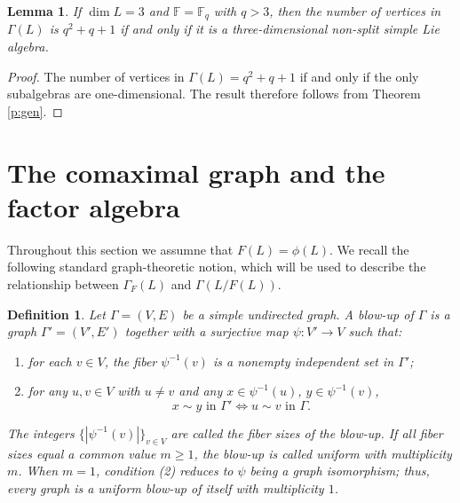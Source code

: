 \documentclass[11pt]{amsart}
\theoremstyle{plain}
\newtheorem{lemma}[theorem]{Lemma}
\newtheorem{definition}{Definition}[section]
\def\F{\mathbb{F}}
\begin{document}
\begin{lemma}
If $\dim L=3$ and $\F=\F_q$ with $q>3$, then the number of vertices in $\Gamma(L)$ is $q^2+q+1$ if and only if it is a three-dimensional non-split simple Lie algebra.
\end{lemma}
\begin{proof}
The number of vertices in $\Gamma(L)=q^2+q+1$ if and only if the only subalgebras are one-dimensional. The result therefore follows from Theorem \ref{p:gen}.   
\end{proof}





\section{The comaximal graph and the factor algebra }





Throughout this section we assumne that $F(L)=\phi(L)$. We recall the following standard graph-theoretic notion, which will be used to describe the relationship between $\Gamma_F(L)$ and $\Gamma(L/F(L))$.

\begin{definition}\label{blowup0}
Let $\Gamma = (V, E)$ be a simple undirected graph. A \emph{blow-up} of
$\Gamma$ is a graph $\Gamma' = (V', E')$ together with a surjective map
$\psi : V' \to V$ such that:
\begin{enumerate}
\item[(a)] for each $v \in V$, the fiber $\psi^{-1}(v)$ is a nonempty independent
      set in $\Gamma'$;
\item[(b)] for any $u, v \in V$ with $u \neq v$ and any $x \in \psi^{-1}(u)$,
      $y \in \psi^{-1}(v)$,
      \[x \sim y \text{ in } \Gamma'   \iff  u \sim v \text{ in } \Gamma.\]
\end{enumerate}
The integers $\{|\psi^{-1}(v)|\}_{v \in V}$ are called the \emph{fiber sizes}
of the blow-up. If all fiber sizes equal a common value $m \geq 1$, the
blow-up is called \emph{uniform} with \emph{multiplicity} $m$. When $m = 1$,
condition (2) reduces to $\psi$ being a graph isomorphism; thus, every graph is a uniform blow-up of itself with multiplicity $1$.
\end{definition}
\end{document}
